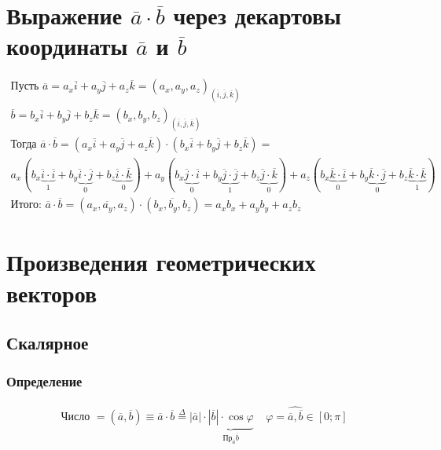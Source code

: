 \documentclass{article}
\begin{document}
\section{Выражение $\overline{a} \cdot \overline{b}$ через декартовы координаты $\overline{a}$ и $\overline{b}$}
\begin{gather*}
    \text{Пусть } \overline{a} = a_x \overline{i} + a_y \overline{j} + a_z \overline{k} = 
    (a_x, a_y, a_z)_{(\overline{i}, \overline{j}, \overline{k})} \\
    \overline{b} = b_x \overline{i} + b_y \overline{j} + b_z \overline{k} = 
    (b_x, b_y, b_z)_{(\overline{i}, \overline{j}, \overline{k})} \\
    \text{Тогда } \overline{a} \cdot \overline{b} =
    (a_x \overline{i} + a_y \overline{j} + a_z \overline{k}) \cdot (b_x \overline{i} + b_y \overline{j} + b_z \overline{k}) = \\
    a_x(b_x \underbrace{\overline{i} \cdot \overline{i}}_{1} + b_y \underbrace{\overline{i} \cdot \overline{j}}_{0} + b_z \underbrace{\overline{i} \cdot \overline{k}}_{0}) +
    a_y(b_x \underbrace{\overline{j} \cdot \overline{i}}_{0} + b_y \underbrace{\overline{j} \cdot \overline{j}}_{1} + b_z \underbrace{\overline{j} \cdot \overline{k}}_{0}) +
    a_z(b_x \underbrace{\overline{k} \cdot \overline{i}}_{0} + b_y \underbrace{\overline{k} \cdot \overline{j}}_{0} + b_z \underbrace{\overline{k} \cdot \overline{k}}_{1}) \\
    \text{Итого: } \overline{a} \cdot \overline{b} = (\overline{a_x, a_y, a_z}) \cdot (\overline{b_x, b_y, b_z}) =
    a_x b_x + a_y b_y + a_z b_z
\end{gather*}



\section{Произведения геометрических векторов}

\subsection{Скалярное}

\subsubsection{Определение}
\begin{gather*}
    \text{Число } = (\overline{a}, \overline{b}) \equiv \overline{a} \cdot \overline{b} \overset{\Delta}{=}
    |\overline{a}| \cdot \underbrace{|\overline{b}| \cdot \cos \varphi}_{\text{Пр}_{\overline{a}} \overline{b}}
    ~~~~~ \varphi = \widehat{\overline{a}, \overline{b}} \in \left[ 0; \pi \right] 
\end{gather*}
\end{document}
